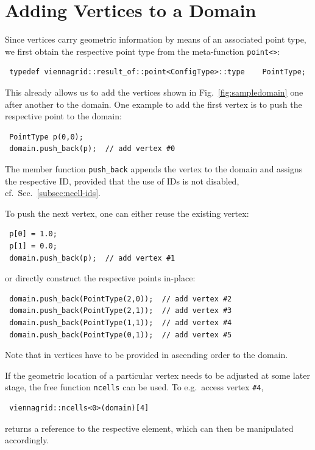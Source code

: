 \section{Adding Vertices to a Domain}
Since vertices carry geometric information by means of an associated point type,
we first obtain the respective point type from the meta-function \lstinline|point<>|:
\begin{lstlisting}
 typedef viennagrid::result_of::point<ConfigType>::type    PointType;
\end{lstlisting}
This already allows us to add the vertices shown in Fig.~\ref{fig:sampledomain} one after another to the domain. One example to add the first vertex is to push the respective point to the domain:
\begin{lstlisting}
 PointType p(0,0);
 domain.push_back(p);  // add vertex #0
\end{lstlisting}
The member function \lstinline|push_back| appends the vertex to the domain and assigns the respective ID, provided that the use of IDs is not disabled, cf.~Sec.~\ref{subsec:ncell-ids}.

To push the next vertex, one can either reuse the existing vertex:
\begin{lstlisting}
 p[0] = 1.0;
 p[1] = 0.0;
 domain.push_back(p);  // add vertex #1
\end{lstlisting}
or directly construct the respective points in-place:
\begin{lstlisting}
 domain.push_back(PointType(2,0));  // add vertex #2
 domain.push_back(PointType(2,1));  // add vertex #3
 domain.push_back(PointType(1,1));  // add vertex #4
 domain.push_back(PointType(0,1));  // add vertex #5
\end{lstlisting}
Note that in {\ViennaGridversion} vertices have to be provided in ascending order to the domain. 


If the geometric location of a particular vertex needs to be adjusted at some later stage, the free function \lstinline|ncells| can be used. To e.g.~access vertex \lstinline|#4|,
\begin{lstlisting}
 viennagrid::ncells<0>(domain)[4]
\end{lstlisting}
returns a reference to the respective element, which can then be manipulated accordingly. 


